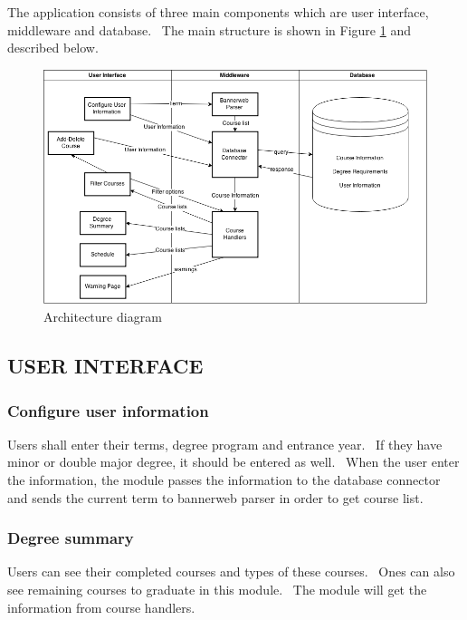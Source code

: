 \documentclass[twoside,letterpaper]{article}
\begin{document}
{\color{black}
The application consists of three main components which are user interface, middleware and database. \ The main structure is shown in Figure \ref{fig:architecture_diagram} and described below.}

\begin{figure}[h]
\centering
\includegraphics[width=\linewidth]{architecturediagram.png}
\caption{Architecture diagram}
\label{fig:architecture_diagram}
\end{figure}

\subsection[USER INTERFACE]{\rmfamily\bfseries\color{black}
USER INTERFACE}

\subsubsection[Configure user information]{\rmfamily\bfseries\color{black}
Configure user information}
{\color{black}
{Users shall enter their terms, degree program and entrance year. \ If they have minor or double major degree, it should be entered as well. \ When the user enter the information, the module passes the information to the database connector and sends the current term to bannerweb parser in order to get course list.}}

\subsubsection[Degree summary]{\rmfamily\bfseries\color{black}
Degree summary}
{\color{black}
{Users can see their completed courses and types of these courses. \ Ones can also see remaining courses to graduate in this module. \ The module will get the information from course handlers.}}
\end{document}
